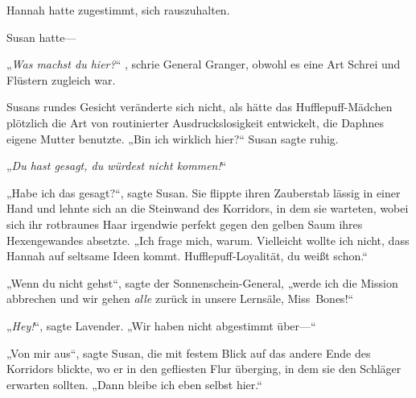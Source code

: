 Hannah hatte zugestimmt, sich rauszuhalten.

Susan hatte—

\later

„\emph{Was machst du hier?}“ , schrie General Granger, obwohl es eine Art Schrei und Flüstern zugleich war.

Susans rundes Gesicht veränderte sich nicht, als hätte das Hufflepuff-Mädchen plötzlich die Art von routinierter Ausdruckslosigkeit entwickelt, die Daphnes eigene Mutter benutzte. „Bin ich wirklich hier?“ Susan sagte ruhig.

„\emph{Du hast gesagt, du würdest nicht kommen!}“

„Habe ich das gesagt?“, sagte Susan. Sie flippte ihren Zauberstab lässig in einer Hand und lehnte sich an die Steinwand des Korridors, in dem sie warteten, wobei sich ihr rotbraunes Haar irgendwie perfekt gegen den gelben Saum ihres Hexengewandes absetzte. „Ich frage mich, warum. Vielleicht wollte ich nicht, dass Hannah auf seltsame Ideen kommt. Hufflepuff-Loyalität, du weißt schon.“

„Wenn du nicht gehst“, sagte der Sonnenschein-General, „werde ich die Mission abbrechen und wir gehen \emph{alle} zurück in unsere Lernsäle, Miss~Bones!“

„\emph{Hey!}“, sagte Lavender. „Wir haben nicht abgestimmt über—“

„Von mir aus“, sagte Susan, die mit festem Blick auf das andere Ende des Korridors blickte, wo er in den gefliesten Flur überging, in dem sie den Schläger erwarten sollten. „Dann bleibe ich eben selbst hier.“

